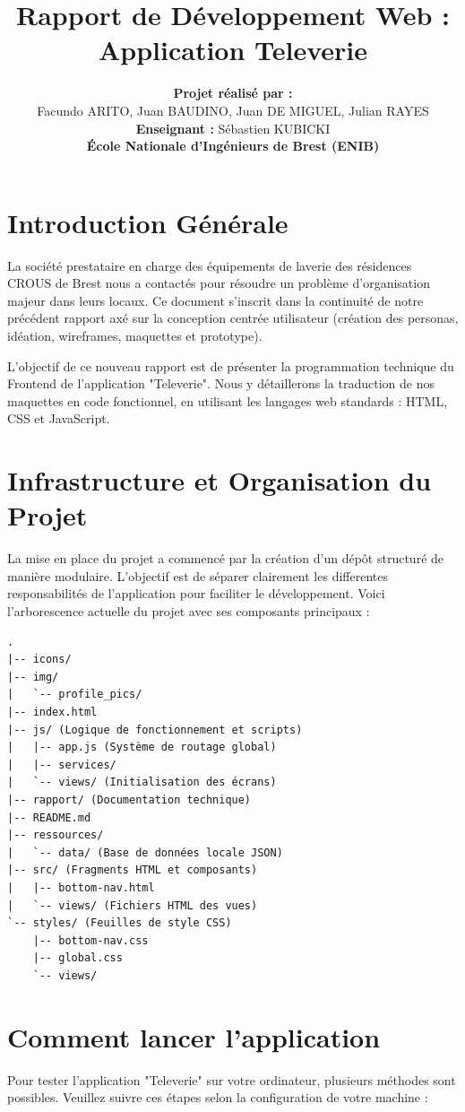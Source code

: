 \documentclass[12pt,a4paper]{article}
\title{\textbf{Rapport de Développement Web : Application Televerie}}
\author{
    \textbf{Projet réalisé par :} \\
    Facundo ARITO, Juan BAUDINO, Juan DE MIGUEL, Julian RAYES \\
    \textbf{Enseignant :} Sébastien KUBICKI \\
    \textbf{École Nationale d'Ingénieurs de Brest (ENIB)}
}
\date{}
\begin{document}
\maketitle
\thispagestyle{empty} %
\pagestyle{empty}     %

\section*{Introduction Générale}
La société prestataire en charge des équipements de laverie des résidences CROUS de Brest nous a contactés pour résoudre un problème d'organisation majeur dans leurs locaux. Ce document s'inscrit dans la continuité de notre précédent rapport axé sur la conception centrée utilisateur (création des personas, idéation, wireframes, maquettes et prototype). 

L'objectif de ce nouveau rapport est de présenter la programmation technique du Frontend de l'application "Televerie". Nous y détaillerons la traduction de nos maquettes en code fonctionnel, en utilisant les langages web standards : HTML, CSS et JavaScript.

\section*{Infrastructure et Organisation du Projet}
La mise en place du projet a commencé par la création d'un dépôt structuré de manière modulaire. L'objectif est de séparer clairement les differentes responsabilités de l'application pour faciliter le développement. Voici l'arborescence actuelle du projet avec ses composants principaux :

\begin{verbatim}
.
|-- icons/
|-- img/
|   `-- profile_pics/
|-- index.html
|-- js/ (Logique de fonctionnement et scripts)
|   |-- app.js (Système de routage global)
|   |-- services/
|   `-- views/ (Initialisation des écrans)
|-- rapport/ (Documentation technique)
|-- README.md
|-- ressources/
|   `-- data/ (Base de données locale JSON)
|-- src/ (Fragments HTML et composants)
|   |-- bottom-nav.html
|   `-- views/ (Fichiers HTML des vues)
`-- styles/ (Feuilles de style CSS)
    |-- bottom-nav.css
    |-- global.css
    `-- views/
\end{verbatim}

\section*{Comment lancer l'application}
Pour tester l'application "Televerie" sur votre ordinateur, plusieurs méthodes sont possibles. Veuillez suivre ces étapes selon la configuration de votre machine :
\end{document}
